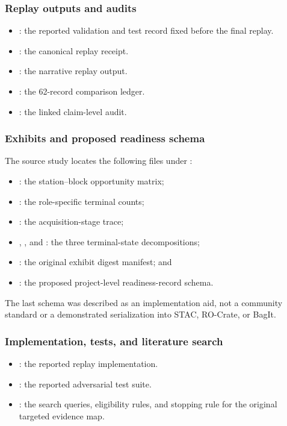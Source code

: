 \subsubsection{Replay outputs and audits}
\begin{itemize}
\item {}:
the reported validation and test record fixed before the final replay.
\item {}:
the canonical replay receipt.
\item {}:
the narrative replay output.
\item {}:
the 62-record comparison ledger.
\item {}:
the linked claim-level audit.
\end{itemize}

\subsubsection{Exhibits and proposed readiness schema}
The source study locates the following files under :
\begin{itemize}
\item {}:
the station--block opportunity matrix;
\item {}:
the role-specific terminal counts;
\item {}:
the acquisition-stage trace;
\item {},
, and
:
the three terminal-state decompositions;
\item {}:
the original exhibit digest manifest; and
\item {}:
the proposed project-level readiness-record schema.
\end{itemize}
The last schema was described as an implementation aid, not a community standard or a demonstrated serialization into STAC, RO-Crate, or BagIt.

\subsubsection{Implementation, tests, and literature search}
\begin{itemize}
\item {}:
the reported replay implementation.
\item {}:
the reported adversarial test suite.
\item {}:
the search queries, eligibility rules, and stopping rule for the original targeted evidence map.
\end{itemize}

